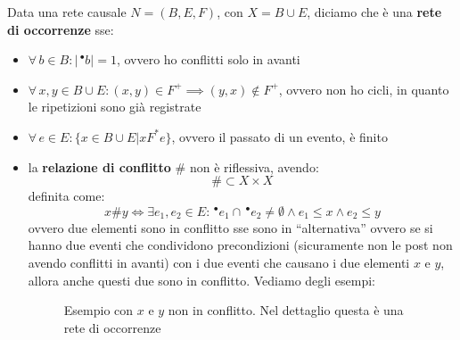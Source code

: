 \documentclass[a4paper,12pt, oneside]{book}
\begin{document}
\begin{definizione}
  Data una rete causale $N=(B,E,F)$, con $X=B\cup E$, diciamo che è una
  \textbf{rete di occorrenze} sse:
  \begin{itemize}
    \item $\forall\,b\in B:|\,^\bullet b|=1$, ovvero ho conflitti solo in
    avanti
    \item $\forall\,x,y\in B\cup E:(x,y)\in F^+\implies (y,x)\not\in F^+$,
    ovvero non ho cicli, in quanto le ripetizioni sono già registrate
    \item $\forall\,e\in E:\{x\in B\cup E|xF^*e\}$, ovvero il passato di un
    evento, è finito 
    \item la \textbf{relazione di conflitto} $\#$ non è riflessiva, avendo:
    \[\#\subset X\times X\]
    definita come:
    \[x\# y\iff \exists e_1,e_2\in E:\,^\bullet e_1\cap \,^\bullet e_2\neq
      \emptyset \land e_1\leq x\land e_2\leq y\]
    ovvero due elementi sono in conflitto sse sono in ``alternativa'' ovvero se
    si hanno due eventi che condividono precondizioni (sicuramente non le post
    non avendo conflitti in avanti) con i due eventi che causano i due elementi
    $x$ e $y$, allora anche questi due sono in conflitto. Vediamo degli esempi:
    \begin{figure}[H]
      \centering
      \caption{Esempio con $x$ e $y$ non in conflitto. Nel dettaglio questa è
        una rete di occorrenze}
      \label{fig:esemp}
    \end{figure}
    \begin{figure}[H]
      \centering
\end{figure}
\end{itemize}
\end{definizione}
\end{document}
